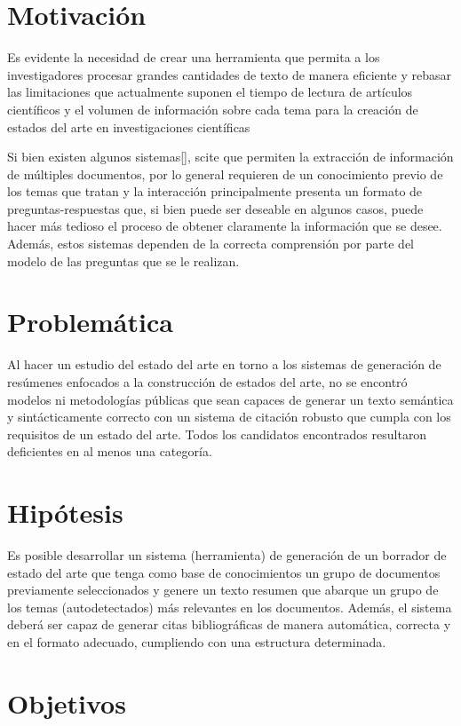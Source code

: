 \section{Motivación}
    Es evidente la necesidad de crear una herramienta que permita a los investigadores procesar grandes cantidades de texto de manera eficiente y rebasar las limitaciones que actualmente suponen el tiempo de lectura de artículos científicos y el volumen de información sobre cada tema para la creación de estados del arte en investigaciones científicas

    Si bien existen algunos sistemas[\cite{elicit}], scite que permiten la extracción de información de múltiples documentos, por lo general requieren de un conocimiento previo de los temas que tratan y la interacción principalmente presenta un formato de preguntas-respuestas que, si bien puede ser deseable en algunos casos, puede hacer más tedioso el proceso de obtener claramente la información que se desee. Además, estos sistemas dependen de la correcta comprensión por parte del modelo de las preguntas que se le realizan.

\section{Problemática}
    Al hacer un estudio del estado del arte en torno a los sistemas de generación de resúmenes enfocados a la construcción de estados del arte, no se encontró modelos ni metodologías públicas que sean capaces de generar un texto semántica y sintácticamente correcto con un sistema de citación robusto que cumpla con los requisitos de un estado del arte. Todos los candidatos encontrados resultaron deficientes en al menos una categoría.

\section{Hipótesis}
    Es posible desarrollar un sistema (herramienta) de generación de un borrador de estado del arte que tenga como base de conocimientos un grupo de documentos previamente seleccionados y genere un texto resumen que abarque un grupo de los temas (autodetectados) más relevantes en los documentos. Además, el sistema deberá ser capaz de generar citas bibliográficas de manera automática, correcta y en el formato adecuado, cumpliendo con una estructura determinada.

\section{Objetivos}

